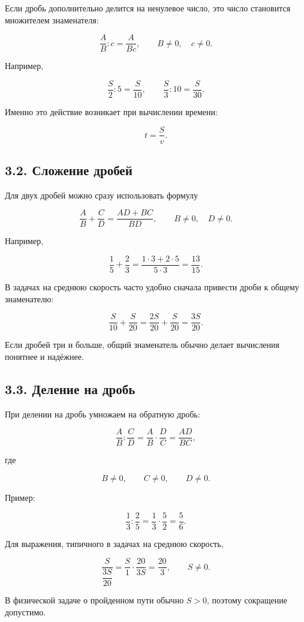 \documentclass[a4paper,12pt]{article}
\begin{document}
Если дробь дополнительно делится на ненулевое число, это число становится множителем знаменателя:

\[
\frac{A}{B}:c=\frac{A}{Bc},
\qquad
B\ne0,
\quad
c\ne0.
\]

Например,

\[
\frac{S}{2}:5=\frac{S}{10},
\qquad
\frac{S}{3}:10=\frac{S}{30}.
\]

Именно это действие возникает при вычислении времени:

\[
t=\frac{S}{v}.
\]

\subsection*{3.2. Сложение дробей}

Для двух дробей можно сразу использовать формулу

\[
\frac{A}{B}+\frac{C}{D}
=\frac{AD+BC}{BD},
\qquad
B\ne0,
\quad
D\ne0.
\]

Например,

\[
\frac{1}{5}+\frac{2}{3}
=\frac{1\cdot3+2\cdot5}{5\cdot3}
=\frac{13}{15}.
\]

В задачах на среднюю скорость часто удобно сначала привести дроби к общему знаменателю:

\[
\frac{S}{10}+\frac{S}{20}
=\frac{2S}{20}+\frac{S}{20}
=\frac{3S}{20}.
\]

Если дробей три и больше, общий знаменатель обычно делает вычисления понятнее и надёжнее.

\subsection*{3.3. Деление на дробь}

При делении на дробь умножаем на обратную дробь:

\[
\frac{A}{B}:\frac{C}{D}
=\frac{A}{B}\cdot\frac{D}{C}
=\frac{AD}{BC},
\]

где

\[
B\ne0,
\qquad
C\ne0,
\qquad
D\ne0.
\]

Пример:

\[
\frac{1}{3}:\frac{2}{5}
=\frac{1}{3}\cdot\frac{5}{2}
=\frac{5}{6}.
\]

Для выражения, типичного в задачах на среднюю скорость,

\[
\frac{S}{\dfrac{3S}{20}}
=\frac{S}{1}\cdot\frac{20}{3S}
=\frac{20}{3},
\qquad S\ne0.
\]

В физической задаче о пройденном пути обычно $S>0$, поэтому сокращение допустимо.
\end{document}

